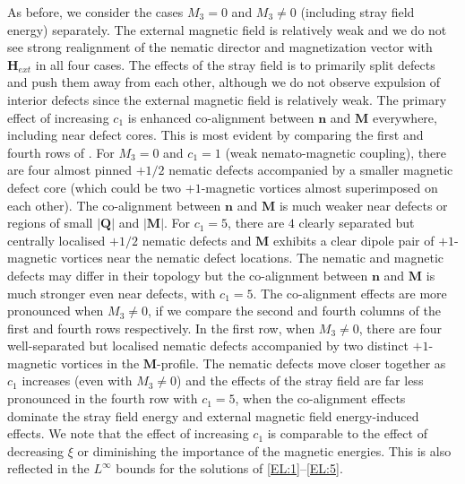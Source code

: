 \documentclass{article}
\def\Qvec{\mathbf{Q}}
\def \Mvec{\mathbf{M}}
\def\nvec{\mathbf{n}}
\def\Hvec{\mathbf{H}}
\begin{document}
As before, we consider the cases $M_3=0$ and $M_3 \neq 0$ (including stray field energy) separately. The external magnetic field is relatively weak and we do not see strong realignment of the nematic director and magnetization vector with $\Hvec_{ext}$ in all four cases. The effects of the stray field is to primarily split defects and push them away from each other, although we do not observe expulsion of interior defects since the external magnetic field is relatively weak. The primary effect of increasing $c_1$ is enhanced co-alignment between $\nvec$ and $\Mvec$ everywhere, including near defect cores. This is most evident by comparing the first and fourth rows of . For $M_3=0$ and $c_1=1$ (weak nemato-magnetic coupling), there are four almost pinned $+1/2$ nematic defects accompanied by a smaller magnetic defect core (which could be two $+1$-magnetic vortices almost superimposed on each other). The co-alignment between $\nvec$ and $\Mvec$ is much weaker near defects or regions of small $|\Qvec|$ and $|\Mvec|$. For $c_1=5$, there are $4$ clearly separated but centrally localised $+1/2$ nematic defects and $\Mvec$ exhibits a clear dipole pair of $+1$-magnetic vortices near the nematic defect locations. The nematic and magnetic defects may differ in their topology but the co-alignment between $\nvec$ and $\Mvec$ is much stronger even near defects, with $c_1=5$. The co-alignment effects are more pronounced when $M_3 \neq 0$, if we compare the second and fourth columns of the first and fourth rows respectively. In the first row, when $M_3 \neq 0$, there are four well-separated but localised nematic defects accompanied by two distinct $+1$-magnetic vortices in the $\Mvec$-profile. The nematic defects move closer together as $c_1$ increases (even with $M_3 \neq 0$) and the effects of the stray field are far less pronounced in the fourth row with $c_1=5$, when the co-alignment effects dominate the stray field energy and external magnetic field energy-induced effects. We note that the effect of increasing $c_1$ is comparable to the effect of decreasing $\xi$ or diminishing the importance of the magnetic energies. This is also reflected in the $L^\infty$ bounds for the solutions of \eqref{EL:1}--\eqref{EL:5}.
\end{document}
